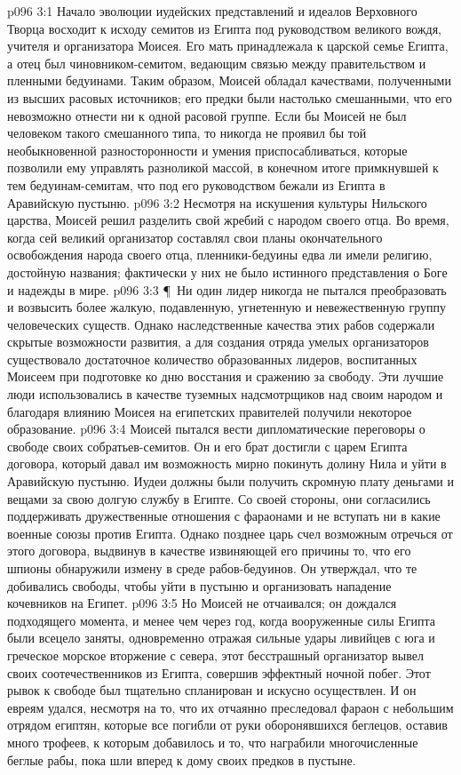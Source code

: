 \vs p096 3:1 Начало эволюции иудейских представлений и идеалов Верховного Творца восходит к исходу семитов из Египта под руководством великого вождя, учителя и организатора Моисея. Его мать принадлежала к царской семье Египта, а отец был чиновником\hyp{}семитом, ведающим связью между правительством и пленными бедуинами. Таким образом, Моисей обладал качествами, полученными из высших расовых источников; его предки были настолько смешанными, что его невозможно отнести ни к одной расовой группе. Если бы Моисей не был человеком такого смешанного типа, то никогда не проявил бы той необыкновенной разносторонности и умения приспосабливаться, которые позволили ему управлять разноликой массой, в конечном итоге примкнувшей к тем бедуинам\hyp{}семитам, что под его руководством бежали из Египта в Аравийскую пустыню.
\vs p096 3:2 Несмотря на искушения культуры Нильского царства, Моисей решил разделить свой жребий с народом своего отца. Во время, когда сей великий организатор составлял свои планы окончательного освобождения народа своего отца, пленники\hyp{}бедуины едва ли имели религию, достойную названия; фактически у них не было истинного представления о Боге и надежды в мире.
\vs p096 3:3 \P\ Ни один лидер никогда не пытался преобразовать и возвысить более жалкую, подавленную, угнетенную и невежественную группу человеческих существ. Однако наследственные качества этих рабов содержали скрытые возможности развития, а для создания отряда умелых организаторов существовало достаточное количество образованных лидеров, воспитанных Моисеем при подготовке ко дню восстания и сражению за свободу. Эти лучшие люди использовались в качестве туземных надсмотрщиков над своим народом и благодаря влиянию Моисея на египетских правителей получили некоторое образование.
\vs p096 3:4 Моисей пытался вести дипломатические переговоры о свободе своих собратьев\hyp{}семитов. Он и его брат достигли с царем Египта договора, который давал им возможность мирно покинуть долину Нила и уйти в Аравийскую пустыню. Иудеи должны были получить скромную плату деньгами и вещами за свою долгую службу в Египте. Со своей стороны, они согласились поддерживать дружественные отношения с фараонами и не вступать ни в какие военные союзы против Египта. Однако позднее царь счел возможным отречься от этого договора, выдвинув в качестве извиняющей его причины то, что его шпионы обнаружили измену в среде рабов\hyp{}бедуинов. Он утверждал, что те добивались свободы, чтобы уйти в пустыню и организовать нападение кочевников на Египет.
\vs p096 3:5 Но Моисей не отчаивался; он дождался подходящего момента, и менее чем через год, когда вооруженные силы Египта были всецело заняты, одновременно отражая сильные удары ливийцев с юга и греческое морское вторжение с севера, этот бесстрашный организатор вывел своих соотечественников из Египта, совершив эффектный ночной побег. Этот рывок к свободе был тщательно спланирован и искусно осуществлен. И он евреям удался, несмотря на то, что их отчаянно преследовал фараон с небольшим отрядом египтян, которые все погибли от руки оборонявшихся беглецов, оставив много трофеев, к которым добавилось и то, что награбили многочисленные беглые рабы, пока шли вперед к дому своих предков в пустыне.
